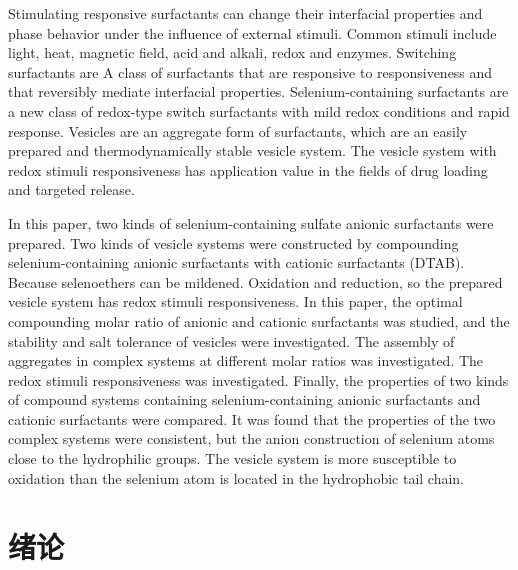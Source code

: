 \documentclass[bachelor,fandolfonts,replaceperiod]{jnuthesis}
\begin{document}
    \begin{englishabstract}
        Stimulating responsive surfactants can change their interfacial properties and phase behavior 
        under the influence of external stimuli. Common stimuli include light, heat, magnetic field, acid 
        and alkali, redox and enzymes. Switching surfactants are A class of surfactants that are responsive 
        to responsiveness and that reversibly mediate interfacial properties. Selenium-containing surfactants 
        are a new class of redox-type switch surfactants with mild redox conditions and rapid response. 
        Vesicles are an aggregate form of surfactants, which are an easily prepared and thermodynamically 
        stable vesicle system. The vesicle system with redox stimuli responsiveness has application value
         in the fields of drug loading and targeted release.
        
        In this paper, two kinds of selenium-containing sulfate anionic surfactants were prepared. Two kinds 
        of vesicle systems were constructed by compounding selenium-containing anionic surfactants with 
        cationic surfactants (DTAB). Because selenoethers can be mildened. Oxidation and reduction, 
        so the prepared vesicle system has redox stimuli responsiveness. In this paper, the optimal 
        compounding molar ratio of anionic and cationic surfactants was studied, and the stability and 
        salt tolerance of vesicles were investigated. The assembly of aggregates in complex systems 
        at different molar ratios was investigated. The redox stimuli responsiveness was investigated. 
        Finally, the properties of two kinds of compound systems containing selenium-containing anionic 
        surfactants and cationic surfactants were compared. It was found that the properties of the two 
        complex systems were consistent, but the anion construction of selenium atoms close to the 
        hydrophilic groups. The vesicle system is more susceptible to oxidation than the selenium atom is 
        located in the hydrophobic tail chain.
    \end{englishabstract}
    
    \tableofcontents
    
    \mainmatter
    
    \chapter{绪论}\label{chapter:introduction}
\end{document}
